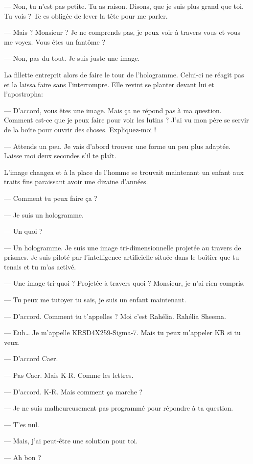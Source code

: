 — Non, tu n'est pas petite. Tu as raison. Disons, que je suis plus grand que
toi. Tu vois ? Te es obligée de lever la tête pour me parler.

— Mais ? Monsieur ? Je ne comprends pas, je peux voir à travers vous et vous me
voyez. Vous êtes un fantôme ?

  — Non, pas du tout. Je suis juste une image.

La fillette entreprit alors de faire le tour de l'hologramme. Celui-ci ne réagit
pas et la laissa faire sans l'interrompre. Elle revint se planter devant lui et
l'apostropha:

— D’accord, vous êtes une image. Mais ça ne répond pas à ma question. Comment
est-ce que je peux faire pour voir les lutins ? J'ai vu mon père se servir de la
boîte pour ouvrir des choses. Expliquez-moi !

— Attends un peu. Je vais d'abord trouver une forme un peu plus adaptée. Laisse
moi deux secondes s'il te plaît.

L'image changea et à la place de l'homme se trouvait maintenant un enfant aux
traits fins paraissant avoir une dizaine d'années.

  — Comment tu peux faire ça ?

  — Je suis un hologramme.

  — Un quoi ?

— Un hologramme. Je suis une image tri-dimensionnelle projetée au travers de
prismes. Je suis piloté par l'intelligence artificielle située dans le boîtier
que tu tenais et tu m'as activé.

— Une image tri-quoi ? Projetée à travers quoi ? Monsieur, je n'ai rien compris.

— Tu peux me tutoyer tu sais, je suis un enfant maintenant.

  — D'accord. Comment tu t'appelles ? Moi c'est Rahélia. Rahélia Sheema.

  — Euh… Je m'appelle KRSD4X259-Sigma-7. Mais tu peux m'appeler KR si tu veux.

  — D’accord Caer.

  — Pas Caer. Mais K-R. Comme les lettres.

  — D'accord. K-R. Mais comment ça marche ?

  — Je ne suis malheureusement pas programmé pour répondre à ta question.

  — T'es nul.

  — Mais, j'ai peut-être une solution pour toi.

  — Ah bon ?

